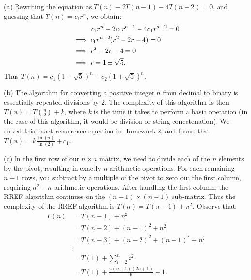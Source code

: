 \documentclass[12pt,twoside,openany]{memoir}
\begin{document}
    \begin{solution}
            (a) Rewriting the equation as $T(n) - 2T(n-1) - 4T(n-2) = 0$, and guessing that $T(n) = c_1 r^n$, we obtain:
                \begin{equation*}
                \begin{split}
                    & \phantom{\implies}\hspace{6.5pt} c_1r^n - 2c_1 r^{n-1} - 4c_1r^{n-2} = 0 \\
                    & \implies c_1r^{n-2}(r^2 - 2r - 4) = 0 \\
                    & \implies r^2 - 2r - 4 = 0 \\
                    & \implies r = 1 \pm \sqrt{5}.
                \end{split}
                \end{equation*}
            Thus $T(n) = c_1 (1-\sqrt{5})^n + c_2 (1 + \sqrt{5})^n$. \nl

            (b) The algorithm for converting a positive integer $n$ from decimal to binary is essentially repeated divisions by $2$. The complexity of this algorithm is then $T(n) = T (\frac{n}{2}) + k$, where $k$ is the time it takes to perform a basic operation (in the case of this algorithm, it would be division or string concatenation). We solved this exact recurrence equation in Homework 2, and found that $T(n) = k \frac{\ln(n)}{\ln(2)} + c_1$. \nl

            (c) In the first row of our $n \times n$ matrix, we need to divide each of the $n$ elements by the pivot, resulting in exactly $n$ arithmetic operations. For each remaining $n-1$ rows, you subtract by a multiple of the pivot to zero out the first column, requiring $n^2 - n$ arithmetic operations. After handling the first column, the RREF algorithm continues on the $(n-1) \times (n-1)$ sub-matrix. Thus the complexity of the RREF algorithm is $T(n) = T(n-1) + n^2$. Observe that:
                \begin{equation*}
                \begin{split}
                    T(n) & = T(n-1) + n^2 \\
                    & = T(n-2) +(n-1)^2 + n^2 \\
                    & = T(n-3) + (n-2)^2 + (n-1)^2 + n^2 \\
                    & \vdots \\
                    & = T(1) + \sum_{i = 2}^ni^2 \\
                    & = T(1) + \frac{n(n+1)(2n+1)}{6} - 1.
                \end{split}
                \end{equation*}
    \end{solution}
    
\end{document}
